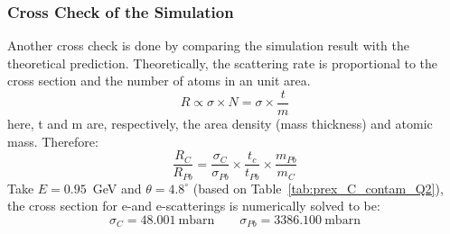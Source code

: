 \subsubsection{Cross Check of the Simulation}
Another cross check is done by comparing the simulation result with the 
theoretical prediction. Theoretically,
the scattering rate is proportional to the cross section and the number of atoms
in an unit area. 
\begin{equation}
    R \propto \sigma \times N = \sigma \times \frac{t}{m}
\end{equation}
here, t and m are, respectively, the area density (mass thickness) and atomic mass. 
Therefore:
\begin{equation}
    \frac{R_C}{R_{Pb}} = \frac{\sigma_C}{\sigma_{Pb}} \times \frac{t_c}{t_{Pb}} \times \frac{m_{Pb}}{m_C}
\end{equation}
Take $E = 0.95$~GeV and $\theta = 4.8^\circ$ (based on Table~\ref{tab:prex_C_contam_Q2}), 
the cross section for e-\C and e-\Pb scatterings is numerically solved to be:
\begin{equation}
    \sigma_C = 48.001\ \mathrm{mbarn}	\qquad \sigma_{Pb} = 3386.100\ \mathrm{mbarn}	
\end{equation}

